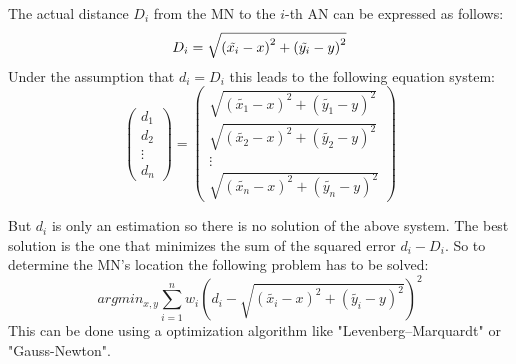 The actual distance \(D_{i}\) from the MN to the \(i\)-th AN can be expressed as follows:
\begin{equation}
D_{i} = \sqrt{\left ( \tilde{x_{i}}-x \right )^{2}+\left ( \tilde{y_{i}}-y \right )^{2}}
\label{eqn: distance MN to AN_{i}}
\end{equation}
Under the assumption that \(d_{i}=D_{i}\)  this leads to the following equation system:
\begin{equation}
\begin{pmatrix}
d_{1}\\ 
d_{2}\\
\vdots\\
d_{n}
\end{pmatrix}
=
\begin{pmatrix}
\sqrt{\left ( \tilde{x_{1}}-x \right )^{2}+\left ( \tilde{y_{1}}-y \right )^{2}}\\
\sqrt{\left ( \tilde{x_{2}}-x \right )^{2}+\left ( \tilde{y_{2}}-y \right )^{2}} \\
\vdots\\
\sqrt{\left ( \tilde{x_{n}}-x \right )^{2}+\left ( \tilde{y_{n}}-y \right )^{2}}
\end{pmatrix}
\label{eqn: trilateration problem as equation system}
\end{equation}

But \(d_{i}\) is only an estimation so there is no  solution of the above system. The best solution is the one that minimizes the sum of the squared error \(d_{i} - D_{i}\). So to determine the MN's location the following problem has to be solved:
\begin{equation}
argmin_{x,y}\sum_{i=1}^{n}w_{i}\left ( d_{i} - \sqrt{\left ( \tilde{x_{i}}-x \right )^{2}+\left ( \tilde{y_{i}}-y \right )^{2}} \right )^{2}
\label{eqn: trilateration as optimization problem}
\end{equation}
This can be done using a optimization algorithm like "Levenberg–Marquardt" or "Gauss-Newton".

